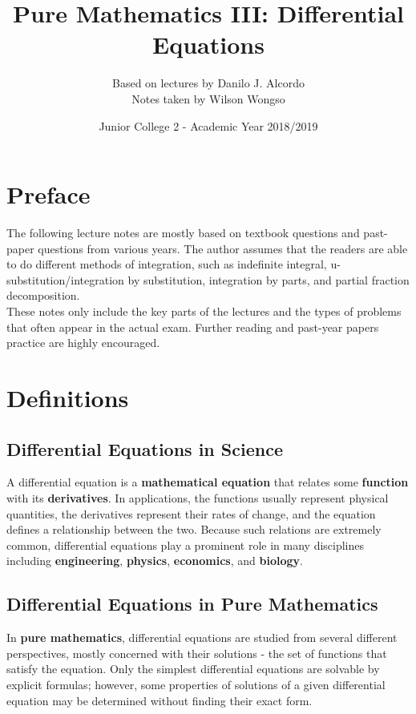 \documentclass[hidelinks, a4paper, 12pt]{article}
\title{Pure Mathematics III: Differential Equations}
\author{Based on lectures by Danilo J. Alcordo \\ Notes taken by Wilson Wongso}
\date{Junior College 2 - Academic Year 2018/2019}
\begin{document}
    \maketitle
    
    \tableofcontents

    \section{Preface}
        The following lecture notes are mostly based on textbook \cite{neill2016cambridge} questions and past-paper questions from various years.
        The author assumes that the readers are able to do different methods of integration, such as indefinite integral, 
        u-substitution/integration by substitution, integration by parts, and partial fraction decomposition.\\[\baselineskip]
        These notes only include the key parts of the lectures and the types of problems that often appear in the actual exam.
        Further reading and past-year papers practice are highly encouraged.

    \section{Definitions}
        \subsection{Differential Equations in Science}
        A differential equation is a \textbf{mathematical equation} that relates some \textbf{function}
        with its \textbf{derivatives}. In applications, the functions usually represent physical quantities,
        the derivatives represent their rates of change, and the equation defines a relationship
        between the two. Because such relations are extremely common, differential equations play
        a prominent role in many disciplines including \textbf{engineering}, \textbf{physics}, 
        \textbf{economics}, and \textbf{biology}.

        \subsection{Differential Equations in Pure Mathematics}
        In \textbf{pure mathematics}, differential equations are studied from several different perspectives,
        mostly concerned with their solutions - the set of functions that satisfy the equation. Only the simplest
        differential equations are solvable by explicit formulas; however, some properties of solutions of
        a given differential equation may be determined without finding their exact form.
    
\end{document}

